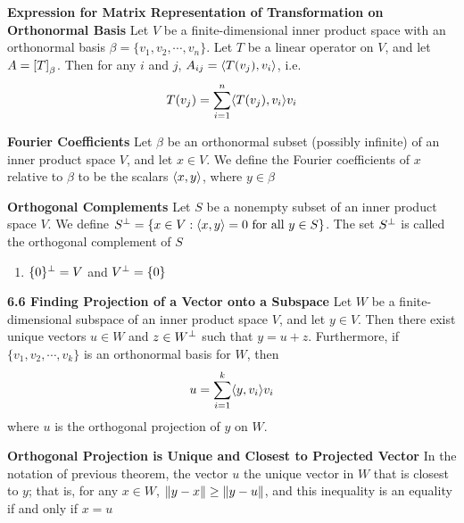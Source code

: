 \documentclass[11pt]{article}
\begin{document}
\begin{corollary*}
    \textbf{Expression for Matrix Representation of Transformation on Orthonormal Basis} Let $V$ be a finite-dimensional inner product space with an orthonormal basis $\beta = \{v_1,v_2,\cdots, v_n\}$. Let $T$ be a linear operator on $V$, and let $A = \left[ T \right]_{\beta}$. Then for any $i$ and $j$, $A_{ij} = \langle T(v_j),v_i\rangle$, i.e. 
    \[
        T(v_j) = \sum_{i=1}^n \langle T(v_j),v_i\rangle  v_i  
    \]
\end{corollary*}


\begin{defn*}
    \textbf{Fourier Coefficients} Let $\beta$ be an orthonormal subset (possibly infinite) of an inner product space $V$, and let $x\in V$. We define the Fourier coefficients of $x$ relative to $\beta$ to be the scalars $\langle x,y\rangle$, where $y\in \beta$
\end{defn*}


\begin{defn*}
    \textbf{Orthogonal Complements} Let $S$  be a nonempty subset of an inner product space $V$. We define $S^{\perp} = \{x\in V: \langle x,y\rangle = 0 \text{ for all } y\in S \}$. The set $S^{\perp}$ is called the orthogonal complement of $S$
    \begin{enumerate}
        \item $\{0\}^{\perp} = V$ and $V^{\perp} = \{0\}$ 
    \end{enumerate}
\end{defn*}

\begin{theorem*}
    \textbf{6.6 Finding Projection of a Vector onto a Subspace} Let $W$ be a finite-dimensional subspace of an inner product space $V$, and let $y\in V$. Then there exist unique vectors $u\in W$ and $z\in W^{\perp}$ such that $y=u+z$. Furthermore, if $\{v_1,v_2,\cdots,v_k\}$ is an orthonormal basis for $W$, then 
    \[
        u = \sum_{i=1}^k \langle y,v_i\rangle v_i    
    \]
    where $u$ is the orthogonal projection of $y$ on $W$.
\end{theorem*}


\begin{corollary*}
    \textbf{Orthogonal Projection is Unique and Closest to Projected Vector} In the notation of previous theorem, the vector $u$ the unique vector in $W$ that is closest to $y$; that is, for any $x\in W$, $\left\lVert y-x\right\rVert \geq \left\lVert y-u\right\rVert$, and this inequality is an equality if and only if $x=u$
\end{corollary*}
\end{document}
